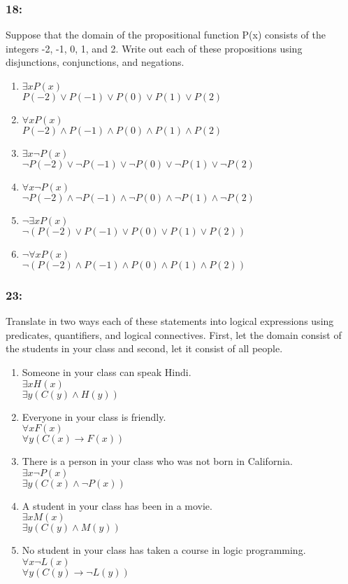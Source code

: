 \documentclass[12pt,en,a4paper]{report}
\begin{document}
	\subsubsection*{18:}
	Suppose that the domain of the propositional function P(x) consists of the integers -2, -1, 0, 1, and 2. Write out each of these propositions using disjunctions, conjunctions, and negations.
	\begin{enumerate}[label=\textbf{\alph*)}]
		\item $\exists xP(x)$\\
		$P(-2) \vee P(-1) \vee P(0) \vee P(1) \vee P(2)$
		\item $\forall x P(x)$\\
		$P(-2) \wedge P(-1) \wedge P(0) \wedge P(1) \wedge P(2)$
		\item $\exists x \neg P(x)$\\
		$\neg P(-2) \vee \neg P(-1) \vee \neg P(0) \vee \neg P(1) \vee \neg P(2)$
		\item $\forall x \neg P(x)$\\
		$\neg P(-2) \wedge \neg P(-1) \wedge \neg P(0) \wedge \neg P(1) \wedge \neg P(2)$
		\item $\neg \exists xP(x)$\\
		$\neg (P(-2) \vee P(-1) \vee P(0) \vee P(1) \vee P(2))$
		\item $\neg \forall x P(x)$\\
		$\neg(P(-2) \wedge P(-1) \wedge P(0) \wedge P(1) \wedge P(2))$ 
	\end{enumerate}
	\subsubsection*{23:}
	Translate in two ways each of these statements into logical expressions using predicates, quantifiers, and logical connectives. First, let the domain consist of the students in your class and second, let it consist of all people.
	\begin{enumerate}[label=\textbf{\alph*)}]
		\item Someone in your class can speak Hindi.\\
		$\exists x H(x)$\\
		$\exists y (C(y) \wedge H(y))$
		\item Everyone in your class is friendly.\\
		$\forall x F(x)$\\
		$\forall y (C(x) \rightarrow F(x))$
		\item There is a person in your class who was not born in California.\\
		$\exists x \neg P(x)$\\
		$\exists y (C(x) \wedge \neg P(x))$
		\item A student in your class has been in a movie.\\
		$\exists x M(x)$\\
		$\exists y (C(y) \wedge M(y))$
		\item No student in your class has taken a course in logic programming.\\
		$\forall x \neg L(x)$\\
		$\forall y (C(y) \rightarrow \neg L(y))$
	\end{enumerate}
\end{document}
